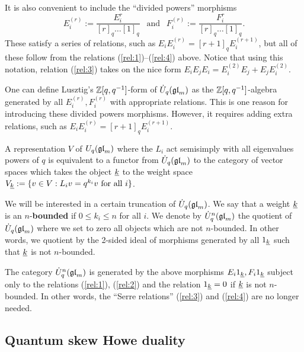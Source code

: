 \documentclass[10pt,leqno]{article}
\begin{document}
It is also convenient to include the ``divided powers'' morphisms
$$E_i^{(r)} := \frac{E_i^r}{[r]_q \dots [1]_q} \ \ \text{ and } \ \ F_i^{(r)} := \frac{F_i^r}{[r]_q \dots [1]_q}.$$
These satisfy a series of relations, such as $E_i E_i^{(r)} = [r+1]_q E_i^{(r+1)}$, but all of these follow from the relations (\ref{rel:1})--(\ref{rel:4}) above. Notice that using this notation, relation (\ref{rel:3}) takes on the nice form $E_iE_jE_i = E_i^{(2)}E_j + E_jE_i^{(2)}$.

\begin{rem}
One can define Lusztig's ${\mathbb{Z}}[q, q^{-1}]$-form of $ \dot{{{U}}}_q({\mathfrak{gl}}_m) $ as the $ {\mathbb{Z}}[q,q^{-1}]$-algebra generated by all $ E_i^{(r)}, F_i^{(r)} $ with appropriate relations. This is one reason for introducing these divided powers morphisms. However, it requires adding extra relations, such as $E_i E_i^{(r)} = [r+1]_q E_i^{(r+1)}$.  
\end{rem}

A representation $ V $ of $ U_q({\mathfrak{gl}}_m) $ where the $ L_i $ act semisimply with all eigenvalues powers of $ q $ is equivalent to a functor from $ \dot{{{U}}}_q({\mathfrak{gl}}_m) $ to the category of vector spaces which takes the object $ {\underline{k}} $ to the weight space $ V_{{\underline{k}}} := \{ v \in V : L_i v = q^{k_i} v \text{ for all } i \} $. 

We will be interested in a certain truncation of $ \dot{{{U}}}_q({\mathfrak{gl}}_m) $.  We say that a weight $ {\underline{k}} $ is an $n$-\textbf{bounded} if $ 0 \le k_i \le n $ for all $ i$.  We denote by $\dot{{{U}}}_q^n({\mathfrak{gl}}_m)$ the quotient of $\dot{{{U}}}_q({\mathfrak{gl}}_m)$ where we set to zero all objects which are not $n$-bounded. In other words, we quotient by the 2-sided ideal of morphisms generated by all $ 1_{{\underline{k}}} $ such that $ {\underline{k}} $ is not $ n$-bounded.

\begin{prop} \label{th:quotientrelations}
The category $ \dot{{{U}}}_q^n({\mathfrak{gl}}_m) $ is generated by the above morphisms $ E_i 1_{{\underline{k}}}, F_i 1_{{\underline{k}}} $ subject only to the relations (\ref{rel:1}), (\ref{rel:2}) and the relation $ 1_{{\underline{k}}} = 0 $ if $ {\underline{k}} $ is not $ n$-bounded. In other words, the ``Serre relations'' (\ref{rel:3}) and (\ref{rel:4}) are no longer needed.
\end{prop}


\subsection{Quantum skew Howe duality}
\end{document}
